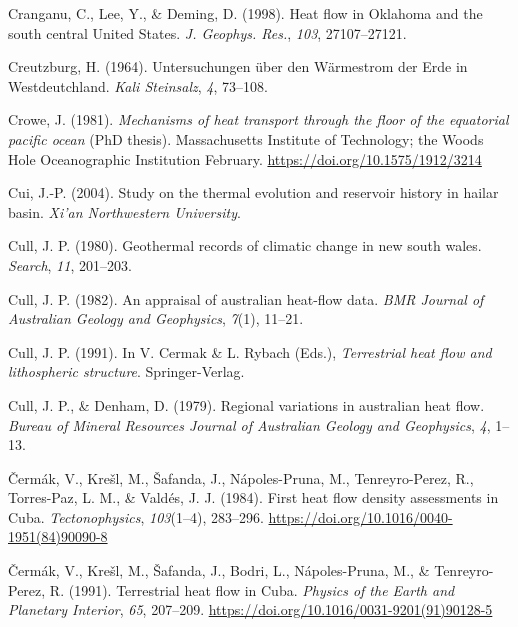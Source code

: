 \documentclass[draft,linenumbers]{agujournal2018}
\begin{document}
\leavevmode{}%
Cranganu, C., Lee, Y., \& Deming, D. (1998). Heat flow in {Oklahoma} and
the south central {United States}. \emph{J. Geophys. Res.}, \emph{103},
27107--27121.

\leavevmode{}%
Creutzburg, H. (1964). Untersuchungen {ü}ber den {W{ä}rmestrom} der
{Erde in Westdeutchland}. \emph{Kali Steinsalz}, \emph{4}, 73--108.

\leavevmode{}%
Crowe, J. (1981). \emph{Mechanisms of heat transport through the floor
of the equatorial pacific ocean} (PhD thesis). Massachusetts Institute
of Technology; the Woods Hole Oceanographic Institution February.
\url{https://doi.org/10.1575/1912/3214}

\leavevmode{}%
Cui, J.-P. (2004). Study on the thermal evolution and reservoir history
in hailar basin. \emph{Xi'an Northwestern University}.

\leavevmode{}%
Cull, J. P. (1980). Geothermal records of climatic change in new south
wales. \emph{Search}, \emph{11}, 201--203.

\leavevmode{}%
Cull, J. P. (1982). An appraisal of australian heat-flow data. \emph{BMR
Journal of Australian Geology and Geophysics}, \emph{7}(1), 11--21.

\leavevmode{}%
Cull, J. P. (1991). In V. Cermak \& L. Rybach (Eds.), \emph{Terrestrial
heat flow and lithospheric structure}. Springer-Verlag.

\leavevmode{}%
Cull, J. P., \& Denham, D. (1979). Regional variations in australian
heat flow. \emph{Bureau of Mineral Resources Journal of Australian
Geology and Geophysics}, \emph{4}, 1--13.

\leavevmode{}%
Čermák, V., Krešl, M., Šafanda, J., Nápoles-Pruna, M., Tenreyro-Perez,
R., Torres-Paz, L. M., \& Valdés, J. J. (1984). {First heat flow density
assessments in Cuba}. \emph{Tectonophysics}, \emph{103}(1--4), 283--296.
\url{https://doi.org/10.1016/0040-1951(84)90090-8}

\leavevmode{}%
Čermák, V., Krešl, M., Šafanda, J., Bodri, L., Nápoles-Pruna, M., \&
Tenreyro-Perez, R. (1991). {Terrestrial heat flow in Cuba}.
\emph{Physics of the Earth and Planetary Interior}, \emph{65}, 207--209.
\url{https://doi.org/10.1016/0031-9201(91)90128-5}
\end{document}
